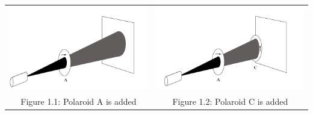 \documentclass[12pt]{article}   	%
\begin{document}
\begin{center}
    \begin{tabular}{ c c }
 \includegraphics[scale=.5]{fig1.PNG}\label{Figure 1.1} & \includegraphics[scale=.5]{fig2.PNG}\label{Figure 1.2}  \\ 
 Figure 1.1: Polaroid A is added & Figure 1.2: Polaroid C is added \\  
\end{tabular}
\end{center}
\end{document}
